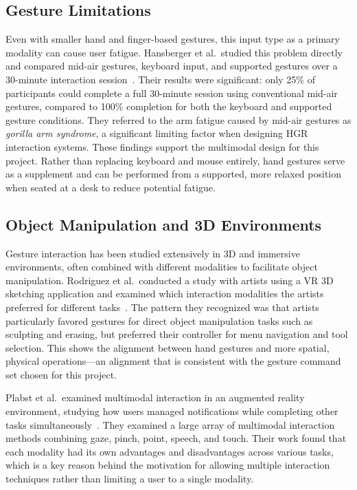 \documentclass[sigconf]{acmart}
\begin{document}
\subsection{Gesture Limitations}

Even with smaller hand and finger-based gestures, this input type as a primary modality can cause user fatigue. Hansberger et al.\ studied this problem directly and compared mid-air gestures, keyboard input, and supported gestures over a 30-minute interaction session~\cite{hansberger2017}. Their results were significant: only 25\% of participants could complete a full 30-minute session using conventional mid-air gestures, compared to 100\% completion for both the keyboard and supported gesture conditions. They referred to the arm fatigue caused by mid-air gestures as \textit{gorilla arm syndrome}, a significant limiting factor when designing HGR interaction systems. These findings support the multimodal design for this project. Rather than replacing keyboard and mouse entirely, hand gestures serve as a supplement and can be performed from a supported, more relaxed position when seated at a desk to reduce potential fatigue.

\subsection{Object Manipulation and 3D Environments}

Gesture interaction has been studied extensively in 3D and immersive environments, often combined with different modalities to facilitate object manipulation. Rodriguez et al.\ conducted a study with artists using a VR 3D sketching application and examined which interaction modalities the artists preferred for different tasks~\cite{rodriguez2024}. The pattern they recognized was that artists particularly favored gestures for direct object manipulation tasks such as sculpting and erasing, but preferred their controller for menu navigation and tool selection. This shows the alignment between hand gestures and more spatial, physical operations—an alignment that is consistent with the gesture command set chosen for this project.

Plabst et al.\ examined multimodal interaction in an augmented reality environment, studying how users managed notifications while completing other tasks simultaneously~\cite{plabst2025}. They examined a large array of multimodal interaction methods combining gaze, pinch, point, speech, and touch. Their work found that each modality had its own advantages and disadvantages across various tasks, which is a key reason behind the motivation for allowing multiple interaction techniques rather than limiting a user to a single modality.
\end{document}
